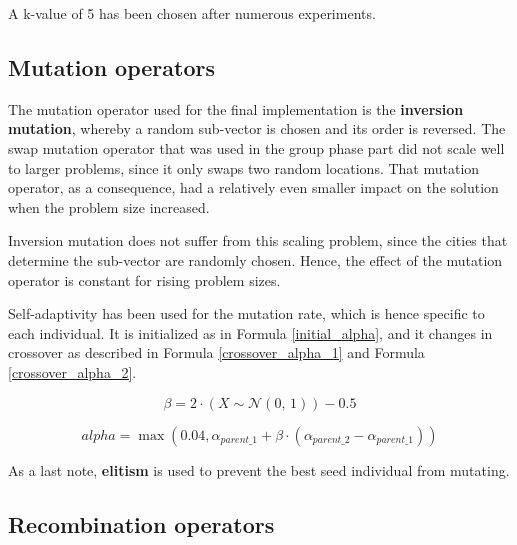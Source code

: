 \documentclass[a4paper,10pt]{article}
\newcommand{\ReplaceMe}[1]{{\color{blue}#1}}
\begin{document}
A k-value of 5 has been chosen after numerous experiments.

\subsection{Mutation operators}
\label{mutation}
The mutation operator used for the final implementation is the \textbf{inversion mutation}, whereby a random sub-vector is chosen and its order is reversed. The swap mutation operator that was used in the group phase part did not scale well to larger problems, since it only swaps two random locations. That mutation operator, as a consequence, had a relatively even smaller impact on the solution when the problem size increased.

Inversion mutation does not suffer from this scaling problem, since the cities that determine the sub-vector are randomly chosen. Hence, the effect of the mutation operator is constant for rising problem sizes.  

Self-adaptivity has been used for the mutation rate, which is hence specific to each individual. It is initialized as in Formula \ref{initial_alpha}, and it changes in crossover as described in Formula \ref{crossover_alpha_1} and Formula \ref{crossover_alpha_2}.

\begin{equation}
    \label{crossover_alpha_1}
    \beta = 2 \cdot (X \sim \mathcal{N}(0,\,1)) - 0.5
\end{equation}

\begin{equation}
    \label{crossover_alpha_2}
    alpha = \max(0.04, \alpha_{parent\_1} + \beta \cdot (\alpha_{parent\_2} - \alpha_{parent\_1}))
\end{equation}

As a last note, \textbf{elitism} is used to prevent the best seed individual from mutating.

\subsection{Recombination operators}
\label{recombination}
\end{document}
